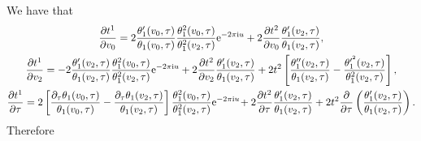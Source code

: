 \documentclass[pdftex]{sigma}%
\numberwithin{equation}{section}
\begin{document}
We have that
\begin{gather*}
\frac{\partial t^1}{\partial v_0}=2\frac{\theta_1^{\prime}(v_0,\tau)}{\theta_1(v_0,\tau)} \frac{\theta_1^2(v_0,\tau)}{\theta_1^2(v_2,\tau)}{\rm e}^{-2\pi {\rm i} u} +2\frac{\partial t^2}{\partial v_0}\frac{\theta_1^{\prime}(v_2,\tau)}{\theta_1(v_2,\tau)},
\\
\frac{\partial t^1}{\partial v_2}=-2\frac{\theta_1^{\prime}(v_2,\tau)}{\theta_1(v_2,\tau)} \frac{\theta_1^2(v_0,\tau)}{\theta_1^2(v_2,\tau)}{\rm e}^{-2\pi {\rm i} u} +2\frac{\partial t^2}{\partial v_2}\frac{\theta_1^{\prime}(v_2,\tau)}{\theta_1(v_2,\tau)} +2t^2\left[\frac{\theta_1^{\prime\prime}(v_2,\tau)}{\theta_1(v_2,\tau)} -\frac{\theta_1^{\prime^2}(v_2,\tau)}{\theta_1^2(v_2,\tau)}\right],
\\
\frac{\partial t^1}{\partial \tau}=2\left[\frac{\partial_{\tau}\theta_1(v_0,\tau)}{\theta_1(v_0,\tau)} -\frac{\partial_{\tau}\theta_1(v_2,\tau)}{\theta_1(v_2,\tau)}\right] \frac{\theta_1^2(v_0,\tau)}{\theta_1^2(v_2,\tau)}{\rm e}^{-2\pi {\rm i} u}\!+2\frac{\partial t^2}{\partial \tau}\frac{\theta_1^{\prime}(v_2,\tau)}{\theta_1(v_2,\tau)}
+2t^2\frac{\partial}{\partial \tau}\left(\frac{\theta_1^{\prime}(v_2,\tau)}{\theta_1(v_2,\tau)}\right).
\end{gather*}
Therefore
\end{document}
